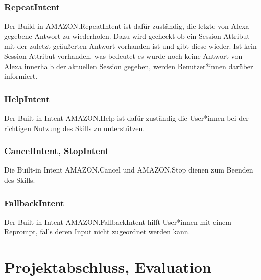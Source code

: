 \documentclass[12pt,letterpaper]{article}
\begin{document}
\subsubsection{RepeatIntent}
Der Build-in AMAZON.RepeatIntent ist dafür zuständig, die letzte von Alexa gegebene Antwort zu wiederholen. Dazu wird gecheckt ob ein Session Attribut mit der zuletzt geäußerten Antwort vorhanden ist und gibt diese wieder. Ist kein Session Attribut vorhanden, was bedeutet es wurde noch keine Antwort von Alexa innerhalb der aktuellen Session gegeben, werden Benutzer*innen darüber informiert. \\


\subsubsection{HelpIntent}
Der Built-in Intent AMAZON.Help ist dafür zuständig die User*innen bei der richtigen Nutzung des Skills zu unterstützen. \\


\subsubsection{CancelIntent, StopIntent}
Die Built-in Intent AMAZON.Cancel und AMAZON.Stop dienen zum Beenden des Skills. \\


\subsubsection{FallbackIntent}
Der Built-in Intent AMAZON.FallbackIntent hilft User*innen mit einem Reprompt, falls deren Input nicht zugeordnet werden kann.\\



\section{Projektabschluss, Evaluation}
\end{document}
